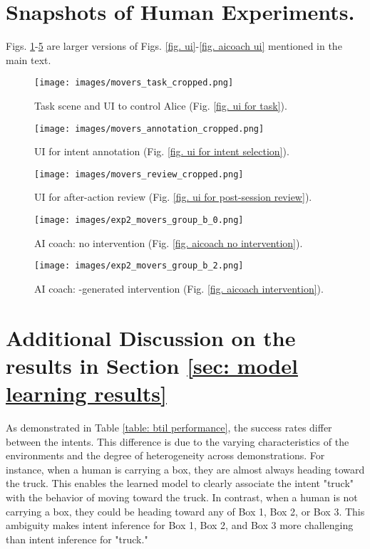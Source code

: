 
\section{Snapshots of Human Experiments.}
Figs. \ref{fig. larger UI for task}-\ref{fig. larger aicoach intervention} are larger versions of Figs. \ref{fig. ui}-\ref{fig. aicoach ui} mentioned in the main text.

\newcommand\gap{0.92}
\begin{figure}[h]
  \centering
  \texttt{[image: images/movers\_task\_cropped.png]}
  \caption{Task scene and UI to control Alice (Fig. \ref{fig. ui for task}).}
  \label{fig. larger UI for task}
\end{figure}
  
\begin{figure}[h]
  \centering
  \texttt{[image: images/movers\_annotation\_cropped.png]}
  \caption{UI for intent annotation (Fig. \ref{fig. ui for intent selection}).}
  \label{fig. larger UI for intent selection}
\end{figure}

\begin{figure}[h]
  \centering
  \texttt{[image: images/movers\_review\_cropped.png]}
  \caption{UI for after-action review (Fig. \ref{fig. ui for post-session review}).}
  \label{fig. larger UI for post-session review}
\end{figure}


\begin{figure}[h]
  \centering
  \texttt{[image: images/exp2\_movers\_group\_b\_0.png]}
  \caption{AI coach: no intervention (Fig. \ref{fig. aicoach no intervention}).}
  \label{fig. larger aicoach no intervention}
\end{figure}

\begin{figure}[h]
  \centering
  \texttt{[image: images/exp2\_movers\_group\_b\_2.png]}
      \caption{AI coach: \coach-generated intervention (Fig. \ref{fig. aicoach intervention}).}
  \label{fig. larger aicoach intervention}
\end{figure}

\section{Additional Discussion on the results in Section \ref{sec: model learning results}}
As demonstrated in Table \ref{table: btil performance}, the success rates differ between the intents. This difference is due to the varying characteristics of the environments and the degree of heterogeneity across demonstrations. For instance, when a human is carrying a box, they are almost always heading toward the truck. This enables the learned model to clearly associate the intent "truck" with the behavior of moving toward the truck. In contrast, when a human is not carrying a box, they could be heading toward any of Box 1, Box 2, or Box 3. This ambiguity makes intent inference for Box 1, Box 2, and Box 3 more challenging than intent inference for "truck."


